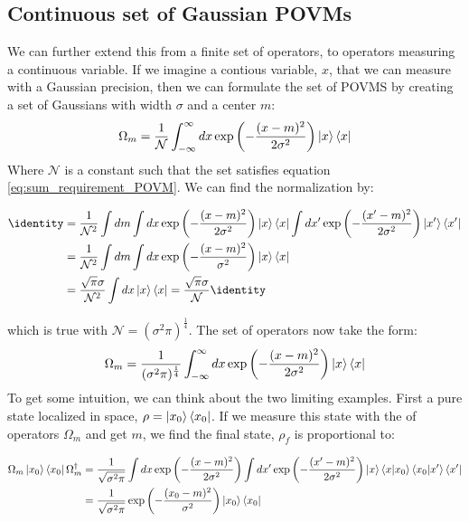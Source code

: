 \subsection{Continuous set of Gaussian POVMs}
We can further extend this from a finite set of operators, to operators measuring a continuous variable. If we imagine a contious variable, $x$, that we can measure with a Gaussian precision, then we can formulate the set of POVMS by creating a set of Gaussians with width $\sigma$ and a center $m$:
\begin{equation}
    \Omega_m = \frac{1}{\mathcal{N}}\int_{-\infty}^\infty dx \exp\left(-\frac{(x- m)^2}{2\sigma^2}\right)\ket{x}\bra{x}
\end{equation}
Where $\mathcal{N}$ is a constant such that the set satisfies equation \ref{eq:sum_requirement_POVM}. We can find the normalization by:
\begin{fullwidth}
\begin{align*}
    \identity &= \frac{1}{\mathcal{N}^2}\int dm \int dx \exp\left(-\frac{(x- m)^2}{2\sigma^2}\right)\ket{x}\bra{x}\int dx' \exp\left(-\frac{(x'- m)^2}{2\sigma^2}\right)\ket{x'}\bra{x'} \\
              &= \frac{1}{\mathcal{N}^2}\int dm \int dx \exp\left(-\frac{(x- m)^2}{\sigma^2}\right)\ket{x}\bra{x} \\
              &= \frac{\sqrt{\pi}\sigma }{\mathcal{N}^2} \int dx \ket{x}\bra{x} = \frac{\sqrt{\pi}\sigma }{\mathcal{N}} \identity 
\end{align*}
\end{fullwidth}
which is true with $\mathcal{N}=(\sigma^2 \pi)^\frac14$. The set of operators now take the form:
\begin{equation}
    \Omega_m = \frac{1}{(\sigma^2 \pi)^\frac14}\int_{-\infty}^\infty dx \exp\left(-\frac{(x- m)^2}{2\sigma^2}\right)\ket{x}\bra{x}
\end{equation}
To get some intuition, we can think about the two limiting examples. First a pure state localized in space, $\rho = \ket{x_0}\bra{x_0}$. If we measure this state with the of operators $\Omega_m$ and get $m$, we find the final state, $\rho_f$ is proportional to:
\begin{fullwidth}
\begin{align}
    \Omega_m \ket{x_0}\bra{x_0}  \Omega_m^\dagger &= \frac{1}{\sqrt{\sigma^2\pi}}\int dx \exp\left(-\frac{(x- m)^2}{2\sigma^2}\right)\int dx' \exp\left(-\frac{(x'- m)^2}{2\sigma^2}\right)\ket{x}\bra{x}\ket{x_0}\bra{x_0}\ket{x'}\bra{x'} \nonumber \\
    &= \frac{1}{\sqrt{\sigma^2\pi}}\exp\left(-\frac{(x_0- m)^2}{\sigma^2}\right)\ket{x_0}\bra{x_0}
\end{align}
\end{fullwidth}
